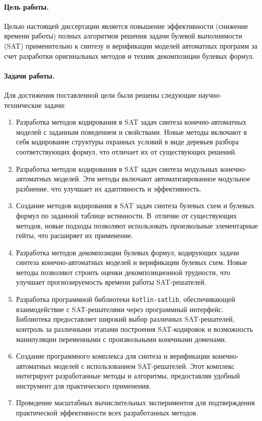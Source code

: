 
%
%
\paragraph{Цель работы.}
%
Целью настоящей диссертации является повышение эффективности (снижение времени работы) полных алгоритмов решения задачи булевой выполнимости (SAT) применительно к синтезу и верификации моделей автоматных программ за счет разработки оригинальных методов и техник декомпозиции булевых формул.


%
%
\paragraph{Задачи работы.}
%
Для достижения поставленной цели были решены следующие научно-технические задачи:
\begin{enumerate}[beginpenalty=10000]
    \item Разработка методов кодирования в SAT задач синтеза конечно-автоматных моделей с заданным поведением и свойствами. Новые методы включают в себя кодирование структуры охранных условий в виде деревьев разбора соответствующих формул, что отличает их от существующих решений.
    \item Разработка методов кодирования в SAT задач синтеза модульных конечно-автоматных моделей. Эти методы включают автоматизированное модульное разбиение, что улучшает их адаптивность и эффективность.
    \item Создание методов кодирования в SAT задач синтеза булевых схем и булевых формул по заданной таблице истинности. В~отличие от существующих методов, новые подходы позволяют использовать произвольные элементарные гейты, что расширяет их применение.
    \item Разработка методов декомпозиции булевых формул, кодирующих задачи синтеза конечно-автоматных моделей и верификации булевых схем. Новые методы позволяют строить оценки декомпозиционной трудности, что улучшает прогнозируемость времени работы SAT-решателей.
    \item Разработка программной библиотеки \texttt{kotlin-satlib}, обеспечивающей взаимодействие с SAT-решателями через программный интерфейс. Библиотека предоставляет широкий выбор различных SAT-решателей, контроль за различными этапами построения SAT-кодировок и возможность манипуляции переменными с произвольными конечными доменами.
    \item Создание программного комплекса  для синтеза и верификации конечно-автоматных моделей с использованием SAT-решателей. Этот комплекс интегрирует разработанные методы и алгоритмы, предоставляя удобный инструмент для практического применения.
    \item Проведение масштабных вычислительных экспериментов для подтверждения практической эффективности всех разработанных методов.
\end{enumerate}


